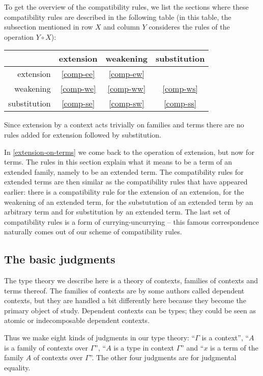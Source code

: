 To get the overview of the compatibility rules, we list the sections
where these compatibility rules are described in the following table (in this
table, the
subsection mentioned in row $X$ and column $Y$ consideres the rules of the
operation $Y\circ X$):
\begin{center}
\begin{tabular}{r|ccc}
& extension & weakening & substitution\\
\hline
extension & \autoref{comp-ee} & \autoref{comp-ew} & \\
weakening & \autoref{comp-we} & \autoref{comp-ww} & \autoref{comp-ws}\\
substitution & \autoref{comp-se} & \autoref{comp-sw} & \autoref{comp-ss}
\end{tabular}
\end{center}
Since extension by a context acts trivially on families and terms there are
no rules added for extension followed by substitution.

In \autoref{extension-on-terms} we come back to the operation of extension, but
now for terms. The rules in this section explain what it means to be a term of
an extended family, namely to be an extended term. The compatibility rules for
extended terms are then similar as the compatibility rules that have appeared
earlier: there is a compatibility rule for the extension of an extension, for
the weakening of an extended term, for the substutution of an extended term by
an arbitrary term and for substitution by an extended term. The last set of
compatibility rules is a form of currying-uncurrying -- this famous
correspondence naturally comes out of our scheme of compatibility rules.

\subsection{The basic judgments}
The type theory we describe here is a theory of contexts, families of
contexts and terms thereof. The families of contexts are by some authors called
dependent contexts, but they are handled a bit differently here because they
become the primary object of study. Dependent contexts can be types; they could
be seen as atomic or indecomposable dependent contexts.

Thus we make eight kinds of judgments in our type theory: ``$\Gamma$ is a context'',
``$A$ is a family of contexts over $\Gamma$'', ``$A$ is a type in context $\Gamma$''
and ``$x$ is a term of the family $A$ of contexts over $\Gamma$''. The other four
judgments are for judgmental equality. 

